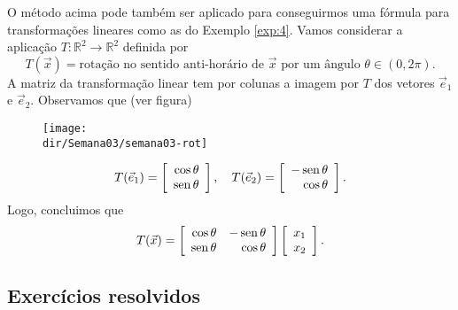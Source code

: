 \documentclass[../livro.tex]{subfiles}
\providecommand{\dir}{..}
\begin{document}
\begin{example}\label{exp:rotacao}
O método acima pode também ser aplicado para conseguirmos uma fórmula para transformações lineares como as do Exemplo \ref{exp:4}. Vamos considerar a aplicação $T: \mathbb{R}^2 \to \mathbb{R}^2$ definida por
\begin{equation}
T(\vec{x}) = \text{rotação no sentido anti-horário de $\vec{x}$ por um ângulo } \theta \in (0, 2\pi).
\end{equation} A matriz da transformação linear tem por colunas a imagem por $T$ dos vetores $\vec{e}_1$ e $\vec{e}_2$. Observamos que (ver figura)
\begin{figure}[h!]
\begin{center}
\texttt{[image: \\dir/Semana03/semana03-rot]}
\end{center}
\end{figure}
\begin{equation}
T(\vec{e}_1) =
\left[
  \begin{array}{r}
    \cos \theta \\
    \operatorname{sen} \theta \\
  \end{array}
\right], \quad T(\vec{e}_2) =
\left[
  \begin{array}{r}
    - \operatorname{sen} \theta \\
    \cos \theta \\
  \end{array}
\right].
\end{equation} Logo, concluimos que
\begin{equation}
T(\vec{x}) = \left[
  \begin{array}{rr}
    \cos \theta  & - \operatorname{sen} \theta \\
    \operatorname{sen} \theta  & \cos \theta \\
  \end{array}
\right]
\left[
  \begin{array}{r}
    x_1 \\
    x_2 \\
  \end{array}
\right].
\end{equation}
\end{example}

\subsection*{Exercícios resolvidos}

\construirExeresol
\end{document}
